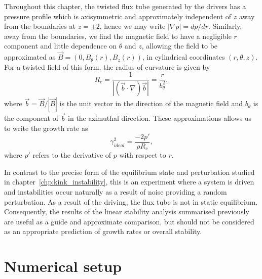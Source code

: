 Throughout this chapter, the twisted flux tube generated by the drivers has a pressure profile which is axisymmetric and approximately independent of $z$ away from the boundaries at $z=\pm2$, hence we may write $|\nabla p| = d p/ dr$. Similarly, away from the boundaries, we find the magnetic field to have a negligible $r$ component and little dependence on $\theta$ and $z$, allowing the field to be approximated as $\vec{B} = (0, B_{\theta}(r), B_z(r))$, in cylindrical coordinates $(r, \theta, z)$. For a twisted field of this form, the radius of curvature is given by 
\begin{equation}
  \label{eq:radius_of_curvature}
  R_c = \frac{1}{|(\vec{b}\cdot\nabla) \vec{b}|} = \frac{r}{b_{\theta}^2},
\end{equation}
where $\vec{b} = \vec{B}/|\vec{B}|$ is the unit vector in the direction of the magnetic field and $b_{\theta}$ is the component of $\vec{b}$ in the azimuthal direction. These approximations allows us to write the growth rate as
\begin{equation}
  \label{eq:fluting_growth_rate2}
\gamma_{ideal}^2 = \frac{-2p'}{\rho R_c},
\end{equation}
where $p'$ refers to the derivative of $p$ with respect to $r$.

In contrast to the precise form of the equilibrium state and perturbation studied in chapter~\ref{chp:kink_instability}, this is an experiment where a system is driven and instabilities occur naturally as a result of noise providing a random perturbation. As a result of the driving, the flux tube is not in static equilibrium. Consequently, the results of the linear stability analysis summarised previously are useful as a guide and approximate comparison, but should not be considered as an appropriate prediction of growth rates or overall stability.

\section{Numerical setup}

